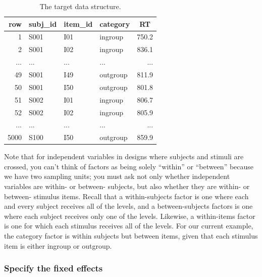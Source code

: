 \documentclass[english,doc,floatsintext]{apa6}
\begin{document}
\begin{table}[H]

\begin{center}
\begin{threeparttable}

\caption{\label{tab:data-example}The target data structure.}

\begin{tabular}{rlllr}
\toprule
row & \multicolumn{1}{c}{subj\_id} & \multicolumn{1}{c}{item\_id} & \multicolumn{1}{c}{category} & \multicolumn{1}{c}{RT}\\
\midrule
1 & S001 & I01 & ingroup & 750.2\\
2 & S001 & I02 & ingroup & 836.1\\
... & ... & ... & ... & ...\\
49 & S001 & I49 & outgroup & 811.9\\
50 & S001 & I50 & outgroup & 801.8\\
51 & S002 & I01 & ingroup & 806.7\\
52 & S002 & I02 & ingroup & 805.9\\
... & ... & ... & ... & ...\\
5000 & S100 & I50 & outgroup & 859.9\\
\bottomrule
\end{tabular}

\end{threeparttable}
\end{center}

\end{table}

Note that for independent variables in designs where subjects and stimuli are crossed, you can't think of factors as being solely \enquote{within} or \enquote{between} because we have two sampling units; you must ask not only whether independent variables are within- or between- subjects, but also whether they are within- or between- stimulus items. Recall that a within-subjects factor is one where each and every subject receives all of the levels, and a between-subjects factors is one where each subject receives only one of the levels. Likewise, a within-items factor is one for which each stimulus receives all of the levels. For our current example, the category factor is within subjects but between items, given that each stimulus item is either ingroup or outgroup.

\hypertarget{specify-the-fixed-effects}{%
\subsubsection{Specify the fixed effects}\label{specify-the-fixed-effects}}
\end{document}
